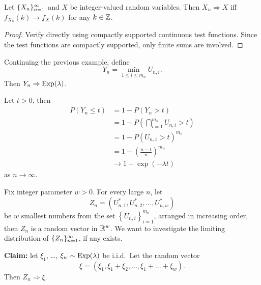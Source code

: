 \documentclass[a4paper]{article}
\newcommand{\convd}{\Rightarrow}
\begin{document}
\begin{prop}
  Let $\{ X_n \}_{n=1}^\infty$ and $X$ be integer-valued random variables.
  Then $X_n \convd X$ iff $f_{X_n} (k) \to f_X (k)$ for any $k \in \mathbb{Z}$.
\end{prop}

\begin{proof}
  Verify directly using compactly supported continuous test functions.
  Since the test functions
  are compactly supported, only finite sums are involved.

\end{proof}

\begin{eg}
  Continuing the previous example, define
  \[
    Y_n = \min_{1 \leq i \leq m_n} U_{n, i}.
  \]
  Then $Y_n \convd \Exp (\lambda)$.

  Let $t > 0$, then
  \begin{align*}
    P \left( Y_n \leq t \right)
     & = 1 - P \left( Y_n > t \right)                          \\
     & = 1 - P \left( \bigcap_{i=1}^{m_n} U_{n, i} > t \right) \\
     & = 1 - P \left( U_{n, 1} > t \right)^{m_n}               \\
     & = 1 - \left( \frac{n - t}{n} \right)^{m_n}              \\
     & \to 1 - \exp (- \lambda t)
  \end{align*}
  as $n \to \infty$.

\end{eg}

\begin{eg}
  Fix integer parameter $w > 0$. For every large $n$, let
  \[
    Z_n = (U_{n, 1}^*, U_{n, 2}^*, \dots, U_{n, w}^*)
  \]
  be $w$ smallest numbers from the set $\left\{ U_{n, i} \right\}_{i=1}^{m_n}$,
  arranged in increasing order, then $Z_n$ is a random
  vector in $\mathbb{R}^w$. We want to investigate the limiting distribution
  of $\{ Z_n \}_{n=1}^\infty$, if any exists.

  \textbf{Claim:} let $\xi_1$, \dots, $\xi_w \sim \operatorname{Exp} (\lambda)$ be i.i.d.\
  Let the random vector
  \[
    \xi = (\xi_1, \xi_1 + \xi_2, \dots, \xi_1 + \dots + \xi_w).
  \]
  Then $Z_n \convd \xi$.

\end{eg}
\end{document}
